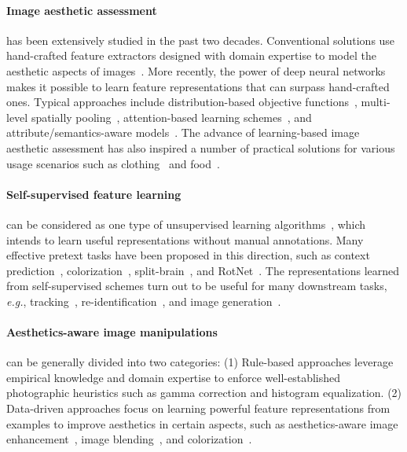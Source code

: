 \documentclass[letterpaper]{article}
\newcommand{\commentout}[1]{} %
\begin{document}
\paragraph{Image aesthetic assessment} has been extensively studied in the past two decades.
Conventional solutions use hand-crafted feature extractors designed with domain expertise to model the aesthetic aspects of images~\cite{datta2006studying,ke2006the}. More recently, the power of deep neural networks makes it possible to learn feature representations that can surpass hand-crafted ones.
Typical approaches include distribution-based objective functions~\cite{talebi2018nima,jin2018predicting}, multi-level spatially pooling~\cite{hosu2019effective}, attention-based learning schemes~\cite{sheng2018attention}, and attribute/semantics-aware models~\cite{ma2017lamp,pan2019image}.
The advance of learning-based image aesthetic assessment has also inspired a number of practical solutions for various usage scenarios such as clothing~\cite{yu2018aesthetic} and food~\cite{Sheng:2018:GPD}.

\paragraph{Self-supervised feature learning} can be considered as one type of unsupervised learning algorithms~\cite{de1994learning}, which intends to learn useful representations without manual annotations.
Many effective pretext tasks have been proposed in this direction, such as context prediction~\cite{doersch2015unsupervised}, colorization~\cite{zhang2016colorful}, split-brain~\cite{zhang2017split}, and RotNet~\cite{gidaris2018unsupervised}.
The representations learned from self-supervised schemes turn out to be useful for many downstream tasks, \emph{e.g.}, tracking~\cite{vondrick2018tracking}, re-identification~\cite{fan2018unsupervised}, and image generation~\cite{lucic2019high-fidelity}\commentout{, especially in the case of using fewer labels}.

\paragraph{Aesthetics-aware image manipulations} can be generally divided into two categories:
(1) Rule-based approaches leverage empirical knowledge and domain expertise to enforce well-established photographic heuristics such as gamma correction and histogram equalization.
(2) Data-driven approaches focus on learning powerful feature representations from examples to improve aesthetics in certain aspects, such as aesthetics-aware image enhancement~\cite{deng2018aesthetic,hu2018exposure}, image blending~\cite{Hung_blend_2018}, and colorization~\cite{zhang2016colorful}.
\end{document}

